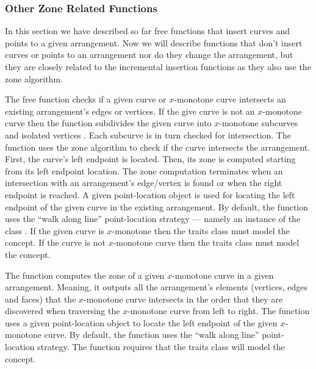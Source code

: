 
\subsubsection{Other Zone Related Functions\label{arr_sssec:zone}}

In this section we have described so far free functions that
insert curves and points to a given arrangement. Now we will describe
functions that don't insert curves or points to an arrangement nor do
they change the arrangement, but they are closely related to the
incremental insertion functions as they also use the zone algorithm.

The free function
checks if a given curve or $x$-monotone
curve intersects an existing arrangement's edges or vertices. 
If the give curve is not an $x$-monotone curve then the function
subdivides the given curve into $x$-monotone subcurves and isolated
vertices . Each subcurve is in turn checked for intersection.
The function uses the zone algorithm to check if the curve intersects
the arrangement. First, the curve's left endpoint is located. Then, 
its zone is computed starting from its left endpoint location. The
zone computation terminates when an intersection with an arrangement's
edge/vertex is found or when the right endpoint is reached. 
A given point-location object is used for locating the left endpoint 
of the given curve in the existing arrangement. By default, the function 
uses the ``walk along line'' point-location strategy --- namely an 
instance of the class 
.
If the given curve is $x$-monotone then the traits
class must model the   concept. If
the curve is not $x$-monotone curve then the traits class must
model the  concept. 

The  function computes the zone of a given $x$-monotone
curve in a given arrangement. Meaning, it outputs all the arrangement's
elements (vertices, edges and faces) that the $x$-monotone curve 
intersects in the order that they are
discovered when traversing the $x$-monotone curve from left to right.
The function uses a given point-location object to locate the left
endpoint of the given $x$-monotone curve. By default, the function 
uses the ``walk along line'' point-location strategy.
The function requires that the traits class will model the
 concept. 

